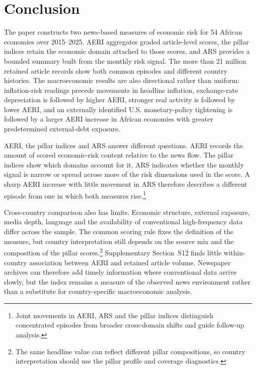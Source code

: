 \documentclass[12pt]{article}
\begin{document}
\FloatBarrier

\section{Conclusion}\label{sec:summary}
The paper constructs two news-based measures of economic risk for 54 African economies over 2015--2025. AERI aggregates graded article-level scores, the pillar indices retain the economic domain attached to those scores, and ARS provides a bounded summary built from the monthly risk signal. The more than 21 million retained article records show both common episodes and different country histories. The macroeconomic results are also directional rather than uniform: inflation-risk readings precede movements in headline inflation, exchange-rate depreciation is followed by higher AERI, stronger real activity is followed by lower AERI, and an externally identified U.S. monetary-policy tightening is followed by a larger AERI increase in African economies with greater predetermined external-debt exposure.

AERI, the pillar indices and ARS answer different questions. AERI records the amount of scored economic-risk content relative to the news flow. The pillar indices show which domains account for it. ARS indicates whether the monthly signal is narrow or spread across more of the risk dimensions used in the score. A sharp AERI increase with little movement in ARS therefore describes a different episode from one in which both measures rise.\footnote{Joint movements in AERI, ARS and the pillar indices distinguish concentrated episodes from broader cross-domain shifts and guide follow-up analysis.}

Cross-country comparison also has limits. Economic structure, external exposure, media depth, language and the availability of conventional high-frequency data differ across the sample. The common scoring rule fixes the definition of the measure, but country interpretation still depends on the source mix and the composition of the pillar scores.\footnote{The same headline value can reflect different pillar compositions, so country interpretation should use the pillar profile and coverage diagnostics.} Supplementary Section~S12 finds little within-country association between AERI and retained article volume. Newspaper archives can therefore add timely information where conventional data arrive slowly, but the index remains a measure of the observed news environment rather than a substitute for country-specific macroeconomic analysis.
\end{document}
